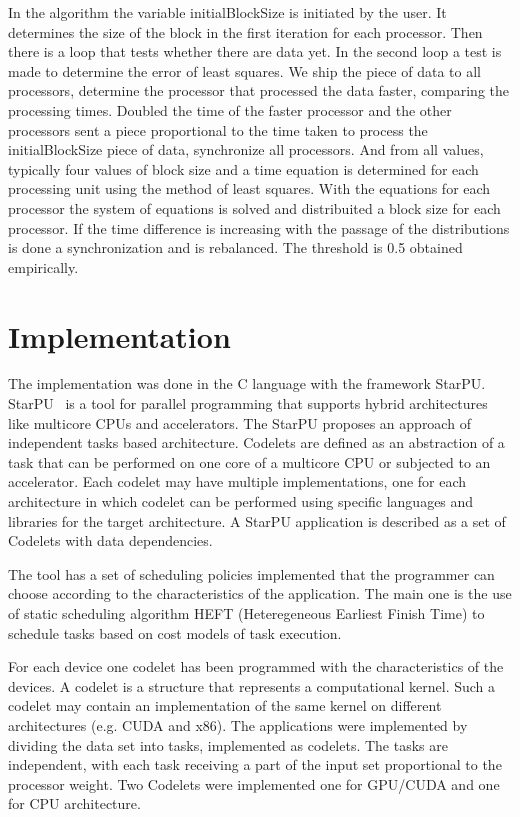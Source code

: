 \documentclass[journal]{IEEEtran}
\begin{document}
In the algorithm the variable initialBlockSize is initiated by the user. It determines the size of the block in the first iteration for each processor. Then there is a loop that tests whether there are data yet. In the second loop a test is made to determine the error of least squares. We ship the piece of data to all processors, determine the processor that processed the data faster, comparing the processing times. Doubled the time of the faster processor and the other processors sent a piece proportional to the time taken to process the initialBlockSize piece of data, synchronize all processors. And from all values, typically four values ​​of block size and a time equation is determined for each processing unit using the method of least squares. With the equations for each processor the system of equations is solved and distribuited a block size for each processor. If the time difference is increasing with the passage of the distributions is done a synchronization and is rebalanced. The threshold is 0.5 obtained empirically.


\section{Implementation}

The implementation was done in the C language with the framework StarPU.
StarPU~\cite{starpu} is a tool for parallel programming that supports hybrid
architectures like multicore CPUs and accelerators. The StarPU proposes an
approach of independent tasks based architecture. Codelets are defined as an
abstraction of a task that can be performed on one core of a multicore CPU or
subjected to an accelerator. Each codelet may have multiple implementations, one
for each architecture in which codelet can be performed using specific languages
and libraries for the target architecture. A StarPU application is described as
a set of Codelets with data dependencies.

The tool has a set of scheduling policies implemented that the programmer can
choose according to the characteristics of the application. The main one is the
use of static scheduling algorithm HEFT (Heteregeneous Earliest Finish Time) to
schedule tasks based on cost models of task execution.

For each device one codelet has been programmed with the characteristics of the
devices. A codelet is a structure that represents a computational kernel. Such a
codelet may contain an implementation of the same kernel on different
architectures (e.g. CUDA and x86).  The applications were implemented by
dividing the data set into tasks, implemented as codelets. The tasks are
independent, with each task receiving a part of the input set proportional to
the processor weight. Two Codelets were implemented one for GPU/CUDA and one for
CPU architecture.
\end{document}
